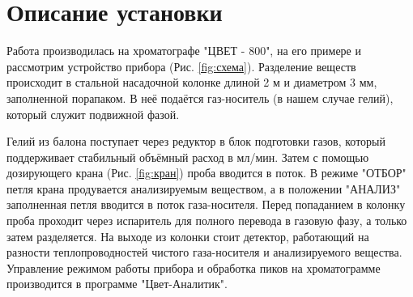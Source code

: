 \documentclass{article}
\begin{document}
\section{Описание установки}\;
\par Работа производилась на хроматографе "ЦВЕТ - 800", на его примере и рассмотрим устройство прибора (Рис. \ref{fig:схема}). Разделение веществ происходит в стальной насадочной колонке длиной 2 м и диаметром 3 мм, заполненной порапаком. В неё подаётся газ-носитель (в нашем случае гелий), который служит подвижной фазой.
\par Гелий из балона поступает через редуктор в блок подготовки газов, который поддерживает стабильный объёмный расход в мл/мин. Затем с помощью дозирующего крана (Рис. \ref{fig:кран}) проба вводится в поток. В режиме "ОТБОР" петля крана продувается анализируемым веществом, а в положении "АНАЛИЗ" заполненная петля вводится в поток газа-носителя. Перед попаданием в колонку проба проходит через испаритель для полного перевода в газовую фазу, а только затем разделяется. На выходе из колонки стоит детектор, работающий на разности теплопроводностей чистого газа-носителя и анализируемого вещества. Управление режимом работы прибора и обработка пиков на хроматограмме производится в программе "Цвет-Аналитик".
\end{document}
